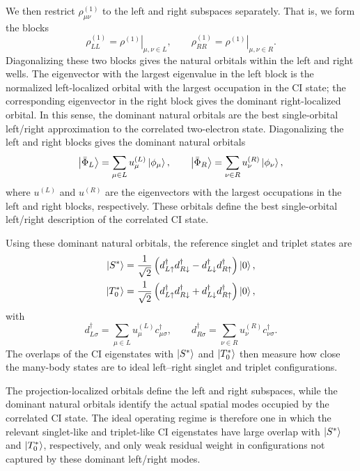 \documentclass[fleqn,10pt]{wlscirep}
\begin{document}
We then restrict $\rho^{(1)}_{\mu\nu}$ to the left and right subspaces separately.
That is, we form the blocks
\begin{equation}
  \rho^{(1)}_{LL}
  =
  \left.
  \rho^{(1)}
  \right|_{\mu,\nu\in L},
  \qquad
  \rho^{(1)}_{RR}
  =
  \left.
  \rho^{(1)}
  \right|_{\mu,\nu\in R}.
\end{equation}
Diagonalizing these two blocks gives the natural orbitals within the left and right wells.  The eigenvector with the largest eigenvalue in the left block is the normalized left-localized orbital with the largest occupation in the CI state; the corresponding eigenvector in the right block gives the dominant right-localized orbital.  In this sense, the dominant natural orbitals are the best single-orbital left/right approximation to the correlated two-electron state. Diagonalizing the left and right blocks gives the dominant natural orbitals
\begin{equation}
  \ket{\bar\Phi_L}
  =
  \sum_{\mu\in L}
  u^{(L)}_\mu \ket{\phi_\mu},
  \qquad
  \ket{\bar\Phi_R}
  =
  \sum_{\nu\in R}
  u^{(R)}_\nu \ket{\phi_\nu},
\end{equation}
where $u^{(L)}$ and $u^{(R)}$ are the eigenvectors with the largest occupations in the left and right blocks, respectively.  These orbitals define the best single-orbital left/right description of the correlated CI state.

Using these dominant natural orbitals, the reference singlet and triplet states are
\begin{align}
  \ket{S^\ast}
  &=
  \frac{1}{\sqrt{2}}
  \left(
  d^\dagger_{L\uparrow}d^\dagger_{R\downarrow}
  -
  d^\dagger_{L\downarrow}d^\dagger_{R\uparrow}
  \right)\ket{0},
  \\
  \ket{T^\ast_0}
  &=
  \frac{1}{\sqrt{2}}
  \left(
  d^\dagger_{L\uparrow}d^\dagger_{R\downarrow}
  +
  d^\dagger_{L\downarrow}d^\dagger_{R\uparrow}
  \right)\ket{0},
\end{align}
with
\begin{equation}
  d^\dagger_{L\sigma}
  =
  \sum_{\mu\in L}
  u^{(L)}_\mu c^\dagger_{\mu\sigma},
  \qquad
  d^\dagger_{R\sigma}
  =
  \sum_{\nu\in R}
  u^{(R)}_\nu c^\dagger_{\nu\sigma}.
\end{equation}
The overlaps of the CI eigenstates with $\ket{S^\ast}$ and $\ket{T^\ast_0}$ then measure how close the many-body states are to ideal left--right singlet and triplet configurations.

The projection-localized orbitals define the left and right subspaces, while the dominant natural orbitals identify the actual spatial modes occupied by the correlated CI state.  The ideal operating regime is therefore one in which the relevant singlet-like and triplet-like CI eigenstates have large overlap with $\ket{S^\ast}$ and $\ket{T^\ast_0}$, respectively, and only weak residual weight in configurations not captured by these dominant left/right modes.
\end{document}
